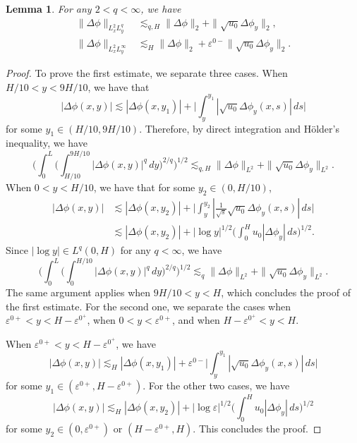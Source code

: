 \documentclass[reqno, 11pt]{amsart}
\theoremstyle{plain}
\newtheorem{lemma}[theorem]{Lemma}
\theoremstyle{definition}
\theoremstyle{remark}
\numberwithin{equation}{section}
\begin{document}
\begin{lemma}
For any $2 < q < \infty$, we have
\begin{equation}\label{est:Delta_phi_mix}
\begin{aligned}
\| \Delta \phi \|_{L^2_x L^q_y} &\lesssim_{q,H} \| \Delta \phi \|_{2} + \| \sqrt{u_0} \Delta \phi_y \|_{2},\\
\| \Delta \phi \|_{L^2_x L^\infty_y}&\lesssim_{H} \| \Delta \phi \|_{2} + \varepsilon^{0-}\| \sqrt{u_0} \Delta \phi_y \|_{2}.
\end{aligned}
\end{equation}
\end{lemma}
\begin{proof}
To prove the first estimate, we separate three cases. When $H/10 < y < 9H/10$, we have that
$$
|\Delta \phi (x,y)| \lesssim |\Delta \phi (x,y_1)| + \Big| \int_y^{y_1} |\sqrt{u_0} \Delta \phi_y (x,s)| \, ds  \Big|
$$
for some $y_1 \in (H/10, 9H/10)$. Therefore, by direct integration and H\"older's inequality, we have
$$
\Bigg( \int_0^L \Big( \int_{H/10}^{9H/10} |\Delta \phi (x,y)|^q \, dy \Big)^{2/q} \Bigg)^{1/2} \lesssim_{q,H} \| \Delta \phi \|_{L^2} + \| \sqrt{u_0} \Delta \phi_y \|_{L^2}.
$$
When $0< y < H/10$, we have that for some $y_2 \in (0, H/10)$,
\begin{align*}
|\Delta \phi (x,y)| &\lesssim |\Delta \phi (x,y_2)| + \Big| \int_y^{y_2} |\frac{1}{\sqrt{s}}\sqrt{u_0} \Delta \phi_y (x,s)| \, ds  \Big|\\
&\lesssim |\Delta \phi (x,y_2)| + |\log y|^{1/2} \Big( \int_0^H u_0 |\Delta \phi_y| \, ds \Big)^{1/2}.
\end{align*}
Since $|\log y| \in L^q(0,H)$ for any $q < \infty$, we have 
$$
\Bigg( \int_0^L \Big( \int_{0}^{H/10} |\Delta \phi (x,y)|^q \, dy \Big)^{2/q} \Bigg)^{1/2} \lesssim_q \| \Delta \phi \|_{L^2} + \| \sqrt{u_0} \Delta \phi_y \|_{L^2}.
$$
The same argument applies when $9H/10< y < H$, which concludes the proof of the first estimate. For the second one, we separate the cases when $\varepsilon^{0+} < y < H - \varepsilon^{0^+}$, when $0 < y < \varepsilon^{0+}$, and when $H - \varepsilon^{0^+} < y < H$.

When $\varepsilon^{0+} < y < H - \varepsilon^{0^+}$, we have
$$
|\Delta \phi (x,y)| \lesssim_H |\Delta \phi (x,y_1)| + \varepsilon^{0-} \Big| \int_y^{y_1} |\sqrt{u_0} \Delta \phi_y (x,s)| \, ds  \Big|
$$
for some $y_1 \in (\varepsilon^{0+}, H - \varepsilon^{0+})$. For the other two cases, we have
$$
|\Delta \phi (x,y)| \lesssim_H |\Delta \phi (x,y_2)| + |\log \varepsilon|^{1/2} \Big( \int_0^H u_0 |\Delta \phi_y| \, ds \Big)^{1/2}
$$
for some $y_2 \in (0, \varepsilon^{0+})$ or $(H - \varepsilon^{0+}, H)$. This concludes the proof.
\end{proof}
\end{document}
